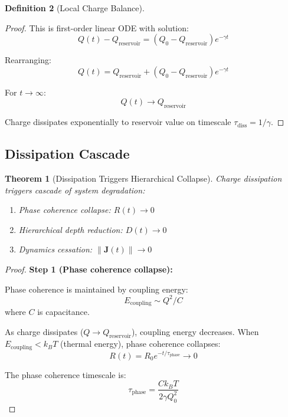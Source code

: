 \documentclass[12pt,a4paper]{article}
\theoremstyle{plain}
\newtheorem{theorem}{Theorem}[section]
\theoremstyle{definition}
\newtheorem{definition}[theorem]{Definition}
\theoremstyle{remark}
\begin{document}
\begin{definition}[Local Charge Balance]
\begin{proof}
This is first-order linear ODE with solution:
\begin{equation}
Q(t) - Q_{\text{reservoir}} = (Q_0 - Q_{\text{reservoir}}) e^{-\gamma t}
\end{equation}

Rearranging:
\begin{equation}
Q(t) = Q_{\text{reservoir}} + (Q_0 - Q_{\text{reservoir}}) e^{-\gamma t}
\end{equation}

For $t \to \infty$:
\begin{equation}
Q(t) \to Q_{\text{reservoir}}
\end{equation}

Charge dissipates exponentially to reservoir value on timescale $\tau_{\text{diss}} = 1/\gamma$.
\end{proof}

\subsection{Dissipation Cascade}

\begin{theorem}[Dissipation Triggers Hierarchical Collapse]
\label{thm:dissipation_cascade}
Charge dissipation triggers cascade of system degradation:
\begin{enumerate}
\item Phase coherence collapse: $R(t) \to 0$
\item Hierarchical depth reduction: $D(t) \to 0$
\item Dynamics cessation: $\|\mathbf{J}(t)\| \to 0$
\end{enumerate}
\end{theorem}

\begin{proof}
\textbf{Step 1 (Phase coherence collapse):}

Phase coherence is maintained by coupling energy:
\begin{equation}
E_{\text{coupling}} \sim Q^2 / C
\end{equation}
where $C$ is capacitance.

As charge dissipates ($Q \to Q_{\text{reservoir}}$), coupling energy decreases. When $E_{\text{coupling}} < k_B T$ (thermal energy), phase coherence collapses:
\begin{equation}
R(t) = R_0 e^{-t/\tau_{\text{phase}}} \to 0
\end{equation}

The phase coherence timescale is:
\begin{equation}
\tau_{\text{phase}} = \frac{C k_B T}{2 \gamma Q_0^2}
\end{equation}


\end{proof}
\end{definition}
\end{document}
